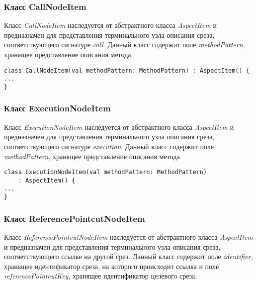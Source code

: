 \subsubsection{Класс CallNodeItem}
\label{ssub:CallNodeItem}
Класс \textit{CallNodeItem} наследуется от абстрактного класса
\textit{AspectItem} и предназначен для представления терминального узла
описания среза, соответствующего сигнатуре \textit{call}.
Данный класс содержит поле \textit{methodPattern}, хранящее представление
описания метода.

\begin{lstlisting}[style={java}, label={lst:CallNodeItem},
  caption={Класс CallNodeItem}]
class CallNodeItem(val methodPattern: MethodPattern) : AspectItem() {
...
}
\end{lstlisting}
\subsubsection{Класс ExecutionNodeItem}
\label{ssub:ExecutionNodeItem}
Класс \textit{ExecutionNodeItem} наследуется от абстрактного класса
\textit{AspectItem} и предназначен для представления терминального узла
описания среза, соответствующего сигнатуре \textit{execution}.
Данный класс содержит поле \textit{methodPattern}, хранящее представление
описания метода.

\begin{lstlisting}[style={java}, label={lst:ExecutionNodeItem},
  caption={Класс ExecutionNodeItem}]
class ExecutionNodeItem(val methodPattern: MethodPattern)
	: AspectItem() {
...
}
\end{lstlisting}
\subsubsection{Класс ReferencePointcutNodeItem}
\label{ssub:ReferencePointcutNodeItem}
Класс \textit{ReferencePointcutNodeItem} наследуется от абстрактного класса
\textit{AspectItem} и предназначен для представления терминального узла
описания среза, соответствующего ссылке на другой срез.
Данный класс содержит поле \textit{identifier}, хранящее идентификатор среза,
на которого происходит ссылка и поле \textit{referencePointcutKey}, хранящее
идентификатор целевого среза.

